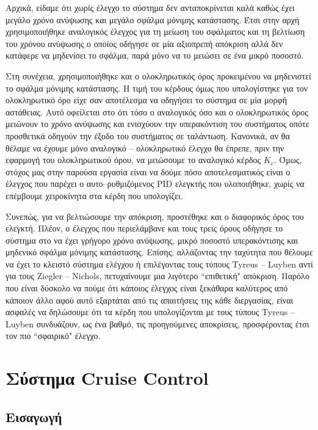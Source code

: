 Αρχικά, είδαμε ότι χωρίς έλεγχο το σύστημα δεν ανταποκρίνεται καλά καθώς έχει μεγάλο χρόνο ανύψωσης και μεγάλο σφάλμα μόνιμης κατάστασης. Έτσι στην αρχή χρησιμοποιήθηκε αναλογικός έλεγχος για τη μείωση του σφάλματος και τη βελτίωση του χρόνου ανύψωσης ο οποίος οδήγησε σε μία αξιοπρεπή απόκριση αλλά δεν κατάφερε να μηδενίσει το σφάλμα, παρά μόνο να το μειώσει σε ένα μικρό ποσοστό. 

Στη συνέχεια, χρησιμοποιήθηκε και ο ολοκληρωτικός όρος προκειμένου να μηδενιστεί το σφάλμα μόνιμης κατάστασης. Η τιμή του κέρδους όμως που υπολογίστηκε για τον ολοκληρωτικό όρο είχε σαν αποτέλεσμα να οδηγήσει το σύστημα σε μία μορφή αστάθειας. Αυτό οφείλεται στο ότι τόσο ο αναλογικός όσο και ο ολοκληρωτικός όρος μειώνουν το χρόνο ανύψωσης και ενισχύουν την υπερακόντιση του συστήματος οπότε προσθετικά οδηγούν την έξοδο του συστήματος σε ταλάντωση. Κανονικά, αν θα θέλαμε να έχουμε μόνο αναλογικό -- ολοκληρωτικό έλεγχο θα έπρεπε, πριν την εφαρμογή του ολοκληρωτικού όρου, να μειώσουμε το αναλογικό κέρδος $K_c$. Όμως, στόχος μας στην παρούσα εργασία είναι να δούμε πόσο αποτελεσματικός είναι ο έλεγχος που παρέχει ο αυτο--ρυθμιζόμενος PID ελεγκτής που υλοποιήθηκε, χωρίς να επέμβουμε χειροκίνητα στα κέρδη που υπολογίζει.

Συνεπώς, για να βελτιώσουμε την απόκριση, προστέθηκε και ο διαφορικός όρος του ελεγκτή. Πλέον, ο έλεγχος που περιελάμβανε και τους τρεις όρους οδήγησε το σύστημα στο να έχει γρήγορο χρόνο ανύψωσης, μικρό ποσοστό υπερακόντισης και μηδενικό σφάλμα μόνιμης κατάστασης. Επίσης, αλλάζοντας την ταχύτητα που θέλουμε να έχει το κλειστό σύστημα ελέγχου ή επιλέγοντας τους τύπους Tyreus -- Luyben αντί για τους Ziegler -- Nichols, πετυχαίνουμε μια λιγότερο ``επιθετική" απόκριση. Παρόλο που είναι δύσκολο να πούμε ότι κάποιος έλεγχος είναι ξεκάθαρα καλύτερος από κάποιον άλλο αφού αυτό εξαρτάται από τις απαιτήσεις της κάθε διεργασίας, είναι ασφαλές να δηλώσουμε ότι τα κέρδη που υπολογίζονται με τους τύπους Tyreus -- Luyben συνδυάζουν, ως ένα βαθμό, τις προηγούμενες αποκρίσεις, προσφέροντας έτσι τον πιο ``σφαιρικό" έλεγχο.

\section{Σύστημα Cruise Control} \label{sec:cruise_control}

\subsection{Εισαγωγή}

